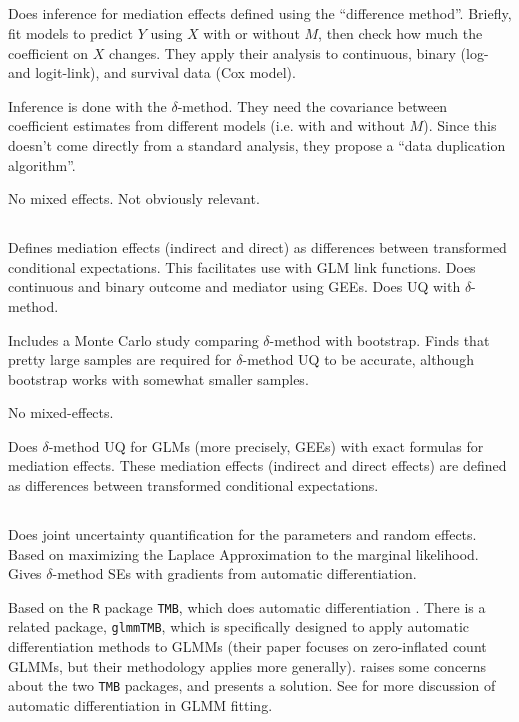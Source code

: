 \documentclass{report}
\begin{document}
\subsection{\citet{Nev17}}

Does inference for mediation effects defined using the ``difference method''. Briefly, fit models to predict $Y$ using $X$ with or without $M$, then check how much the coefficient on $X$ changes. They apply their analysis to continuous, binary (log- and logit-link), and survival data (Cox model).

Inference is done with the $\delta$-method. They need the covariance between coefficient estimates from different models (i.e. with and without $M$). Since this doesn't come directly from a standard analysis, they propose a ``data duplication algorithm''.

No mixed effects. Not obviously relevant.


\subsection{\citet{Che21}}

Defines mediation effects (indirect and direct) as differences between transformed conditional expectations. This facilitates use with GLM link functions. Does continuous and binary outcome and mediator using GEEs. Does UQ with $\delta$-method. 

Includes a Monte Carlo study comparing $\delta$-method with bootstrap. Finds that pretty large samples are required for $\delta$-method UQ to be accurate, although bootstrap works with somewhat smaller samples.

No mixed-effects.

Does $\delta$-method UQ for GLMs (more precisely, GEEs) with exact formulas for mediation effects. These mediation effects (indirect and direct effects) are defined as differences between transformed conditional expectations. 


\subsection{\citet{Zhe21}}

Does joint uncertainty quantification for the parameters and random effects. Based on maximizing the Laplace Approximation to the marginal likelihood. Gives $\delta$-method SEs with gradients from automatic differentiation.

Based on the \texttt{R} package \texttt{TMB}, which does automatic differentiation \citep{Kri16}. There is a related package, \texttt{glmmTMB}, which is specifically designed to apply automatic differentiation methods to GLMMs \citep{Bro17} (their paper focuses on zero-inflated count GLMMs, but their methodology applies more generally). \citet{Zhe21} raises some concerns about the two \texttt{TMB} packages, and presents a solution. See \citet{Ska06} for more discussion of automatic differentiation in GLMM fitting.
\end{document}
